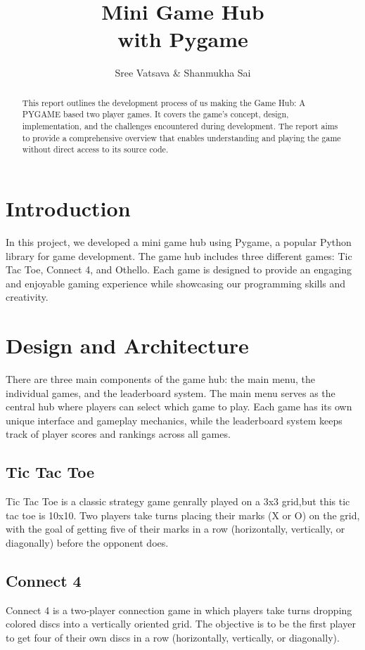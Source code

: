 \documentclass[12pt]{article}
\title{Mini Game Hub \\ with Pygame}
\author{Sree Vatsava \& Shanmukha Sai}
\date{}
\begin{document}
\maketitle

    \begin{abstract}
        This report outlines the development process of us making the Game Hub: A PYGAME based two player games.
        It covers the game's concept, design, implementation, and the challenges encountered during development.
        The report aims to provide a comprehensive overview that enables understanding and playing the game without direct access to its source code.
    \end{abstract}

\tableofcontents
\clearpage

\section{Introduction}
In this project, we developed a mini game hub using Pygame, a popular Python library for game development. The game hub includes three different games: Tic Tac Toe, Connect 4, and Othello. Each game is designed to provide an engaging and enjoyable gaming experience while showcasing our programming skills and creativity.

\section{Design and Architecture}
There are three main components of the game hub: the main menu, the individual games, and the leaderboard system. The main menu serves as the central hub where players can select which game to play. Each game has its own unique interface and gameplay mechanics, while the leaderboard system keeps track of player scores and rankings across all games.
\subsection{Tic Tac Toe}
Tic Tac Toe is a classic strategy game genrally played on a 3x3 grid,but this tic tac toe is 10x10. Two players take turns placing their marks (X or O) on the grid, with the goal of getting five of their marks in a row (horizontally, vertically, or diagonally) before the opponent does.
\subsection{Connect 4}
Connect 4 is a two-player connection game in which players take turns dropping colored discs into a vertically oriented grid. The objective is to be the first player to get four of their own discs in a row (horizontally, vertically, or diagonally).
\end{document}
